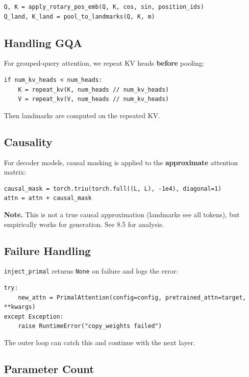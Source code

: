 \begin{lstlisting}
Q, K = apply_rotary_pos_emb(Q, K, cos, sin, position_ids)
Q_land, K_land = pool_to_landmarks(Q, K, m)
\end{lstlisting}

\subsection{Handling GQA}

For grouped-query attention, we repeat KV heads \textbf{before} pooling:

\begin{lstlisting}
if num_kv_heads < num_heads:
    K = repeat_kv(K, num_heads // num_kv_heads)
    V = repeat_kv(V, num_heads // num_kv_heads)
\end{lstlisting}

Then landmarks are computed on the repeated KV.

\subsection{Causality}

For decoder models, causal masking is applied to the \textbf{approximate} attention 
matrix:

\begin{lstlisting}
causal_mask = torch.triu(torch.full((L, L), -1e4), diagonal=1)
attn = attn + causal_mask
\end{lstlisting}

\textbf{Note.} This is not a true causal approximation (landmarks see all tokens), 
but empirically works for generation. See  8.5 for analysis.

\subsection{Failure Handling}

\texttt{inject\_primal} returns \texttt{None} on failure and logs the error:

\begin{lstlisting}
try:
    new_attn = PrimalAttention(config=config, pretrained_attn=target, **kwargs)
except Exception:
    raise RuntimeError("copy_weights failed")
\end{lstlisting}

The outer loop can catch this and continue with the next layer.

\subsection{Parameter Count}

